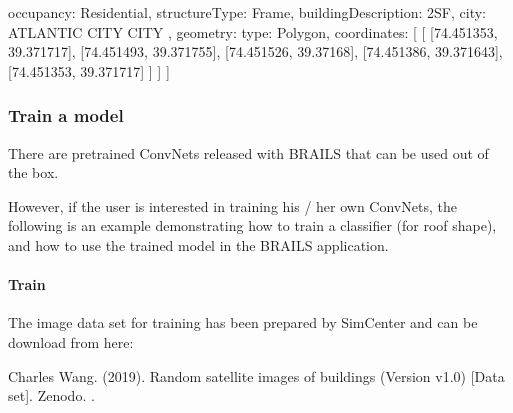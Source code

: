 \documentclass[letterpaper,10pt,english]{sphinxmanual}
\begin{document}
\begin{sphinxVerbatim}[commandchars=\\\{\}]
                            \PYGZdq{}occupancy\PYGZdq{}: \PYGZdq{}Residential\PYGZdq{},
                            \PYGZdq{}structureType\PYGZdq{}: \PYGZdq{}Frame\PYGZdq{},
                            \PYGZdq{}buildingDescription\PYGZdq{}: \PYGZdq{}2SF\PYGZdq{},
                            \PYGZdq{}city\PYGZdq{}: \PYGZdq{}ATLANTIC CITY CITY\PYGZdq{}
                    \PYGZcb{},
                    \PYGZdq{}geometry\PYGZdq{}: \PYGZob{}
                            \PYGZdq{}type\PYGZdq{}: \PYGZdq{}Polygon\PYGZdq{},
                            \PYGZdq{}coordinates\PYGZdq{}: [
                                    [
                                            [\PYGZhy{}74.451353, 39.371717],
                                            [\PYGZhy{}74.451493, 39.371755],
                                            [\PYGZhy{}74.451526, 39.37168],
                                            [\PYGZhy{}74.451386, 39.371643],
                                            [\PYGZhy{}74.451353, 39.371717]
                                    ]
                            ]
                    \PYGZcb{}
            \PYGZcb{}
    ]
\PYGZcb{}
\end{sphinxVerbatim}


\subsubsection{Train a model}
\label{\detokenize{common/user_manual/train:train-a-model}}\label{\detokenize{common/user_manual/train:lbl-train}}\label{\detokenize{common/user_manual/train::doc}}
\sphinxAtStartPar
There are pretrained ConvNets released with BRAILS that can be used out of the box.

\sphinxAtStartPar
However, if the user is interested in training his / her own ConvNets, the following is an example demonstrating
how to train a classifier (for roof shape), and how to use the trained model in the BRAILS application.


\paragraph{Train}
\label{\detokenize{common/user_manual/train:train}}
\sphinxAtStartPar
The image data set for training has been prepared by SimCenter and can be download from here:

\sphinxAtStartPar
Charles Wang. (2019). Random satellite images of buildings (Version v1.0) {[}Data set{]}. Zenodo. .
\end{document}
